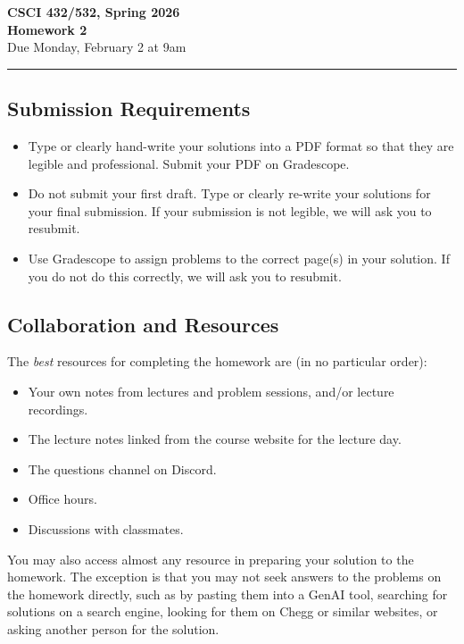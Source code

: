 \documentclass[11pt]{article}
\begin{document}
\begin{center}
\Large\textbf{CSCI 432/532, Spring 2026}%
\\
\LARGE\textbf{Homework 2}%
\\[0.5ex]
\large Due Monday, February 2 at 9am
\end{center}

\bigskip
\hrule
\bigskip

\subsection*{Submission Requirements}
\begin{itemize}
    \item Type or clearly hand-write your solutions into a PDF format so that they are legible and professional. Submit your PDF on Gradescope. 
    \item Do not submit your first draft. Type or clearly re-write your solutions for your final submission. If your submission is not legible, we will ask you to resubmit.
    \item Use Gradescope to assign problems to the correct page(s) in your solution. If you do not do this correctly, we will ask you to resubmit.
\end{itemize}

\subsection*{Collaboration and Resources}

The \emph{best} resources for completing the homework are (in no particular order):
\begin{itemize}
	\item Your own notes from lectures and problem sessions, and/or lecture recordings.
	\item The lecture notes linked from the course website for the lecture day.
	\item The questions channel on Discord.
	\item Office hours.
	\item Discussions with classmates.
\end{itemize}
You may also access almost any resource in preparing your solution to the
homework. The exception is that you may not seek answers to the problems on the
homework directly, such as by pasting them into a GenAI tool, searching for
solutions on a search engine, looking for them on Chegg or similar websites, or
asking another person for the solution.
\end{document}
